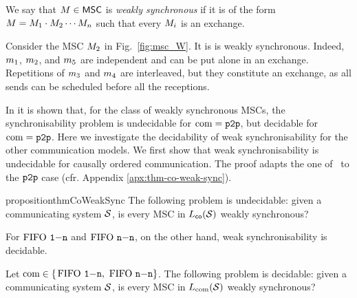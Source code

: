 \begin{definition}\label{def:weaksync-new}
	We say that $M \in \mathsf{MSC}$ is
	\emph{weakly synchronous} if it is of the form
	$M = M_1 \cdot M_2 \cdots M_n$
	such that every $M_i$ is an exchange.
\end{definition}

\begin{example}\label{example:msc_W}
	Consider the MSC $M_{2}$ in Fig.~\ref{fig:msc_W}. It is is weakly synchronous. Indeed, $m_1$, $m_2$, and $m_5$ are independent and can be put alone in an exchange. Repetitions of $m_3$ and $m_4$ are interleaved, but they constitute an exchange, as  all sends can be scheduled before all the receptions.
\end{example}

In \cite{BolligGFLLS21} it is shown that, for the class of weakly synchronous MSCs, 
the synchronisability problem is undecidable for $\textup{com} = \mathtt{p2p}$, but decidable for $\textup{com} = \mathtt{p2p}$.
Here we investigate the decidability of weak synchronisability for the other 
communication models. We first show that weak synchronisability 
is undecidable for causally ordered communication. 
The proof adapts  the one of~\cite[Theorem~20]{BolligGFLLS21-long} to the $\mathtt{p2p}$ case (cfr. Appendix \ref{apx:thm-co-weak-sync}).
\begin{restatable}{proposition}{thmCoWeakSync}
\label{thm:co-weaksync}
	The following problem is undecidable:
	given a communicating system $\mathcal{S}$,
	is every MSC in $L_{\mathsf{co}}(\mathcal{S})$ weakly synchronous?
\end{restatable}

For $\text{FIFO } \mathtt{1\mathsf{-}n}$ and $\text{FIFO } \mathtt{n\mathsf{-}n}$, on the other hand, weak synchronisability is decidable. 

\begin{proposition}\label{thm:weak-sync}
	Let $\textup{com} \in \{$$\text{FIFO } \mathtt{1\mathsf{-}n}, $ $\text{FIFO } \mathtt{n\mathsf{-}n}\}$.
	The following problem is decidable:
	given a communicating system $\mathcal{S}$,
	is every MSC in $L_{\textup{com}}(\mathcal{S})$ weakly synchronous?
\end{proposition}

